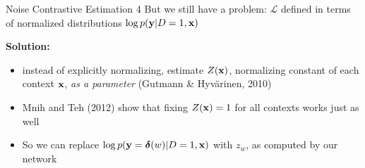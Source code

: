 \documentclass{beamer}
\begin{document}
\begin{frame}{Noise Contrastive Estimation 4}
But we still have a problem: $\mathcal{L}$ defined in terms of normalized distributions $\log p(\mathbf{y}|D=1, \mathbf{x})$

\textbf{Solution:} 
\begin{itemize}
\item instead of explicitly normalizing, estimate $Z({\mathbf{x}})$, normalizing constant of each context $\mathbf{x}$, \textit{as a parameter} (Gutmann \& Hyv{\"a}rinen, 2010)
\item  Mnih and Teh (2012) show that fixing $Z({\mathbf{x}})=1$ for all contexts works just as well
\item So we can replace $\log p(\mathbf{y} = \boldsymbol{\delta}(w)|D=1, \mathbf{x})$ with $z_w$, as computed by our network
\end{itemize}

%
%
\end{frame}


%
%
\end{document}
